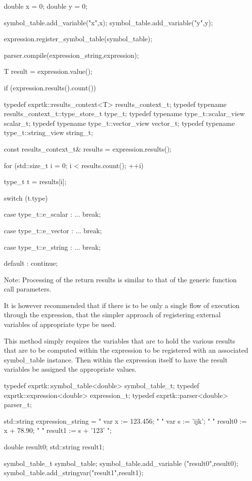 double x = 0;
double y = 0;

symbol\_table.add\_variable("x",x);
symbol\_table.add\_variable("y",y);

expression.register\_symbol\_table(symbol\_table);

parser.compile(expression\_string,expression);

T result = expression.value();

if (expression.results().count())
{
typedef exprtk::results\_context<T> results\_context\_t;
typedef typename results\_context\_t::type\_store\_t type\_t;
typedef typename type\_t::scalar\_view scalar\_t;
typedef typename type\_t::vector\_view vector\_t;
typedef typename type\_t::string\_view string\_t;

const results\_context\_t\& results = expression.results();

for (std::size\_t i = 0; i < results.count(); ++i)
{
	type\_t t = results[i];
	
	switch (t.type)
	{
		case type\_t::e\_scalar : ...
		break;
		
		case type\_t::e\_vector : ...
		break;
		
		case type\_t::e\_string : ...
		break;
		
		default               : continue;
	}
}


Note: Processing of the return results is similar to that of the
generic function call parameters.

It is however recommended that if there is to be only a single flow of
execution  through  the  expression,  that  the  simpler  approach  of
registering external variables of appropriate type be used.

This method simply requires the variables that are to hold the various
results that are to be computed within the expression to be registered
with an associated symbol\_table  instance. Then within the  expression
itself  to  have  the result  variables  be  assigned the  appropriate
values.

typedef exprtk::symbol\_table<double> symbol\_table\_t;
typedef exprtk::expression<double>     expression\_t;
typedef exprtk::parser<double>             parser\_t;

std::string expression\_string =
" var x := 123.456;     "
" var s := 'ijk';       "
" result0 := x + 78.90; "
" result1 := s + '123'  ";

double      result0;
std::string result1;

symbol\_table\_t symbol\_table;
symbol\_table.add\_variable ("result0",result0);
symbol\_table.add\_stringvar("result1",result1);

}
